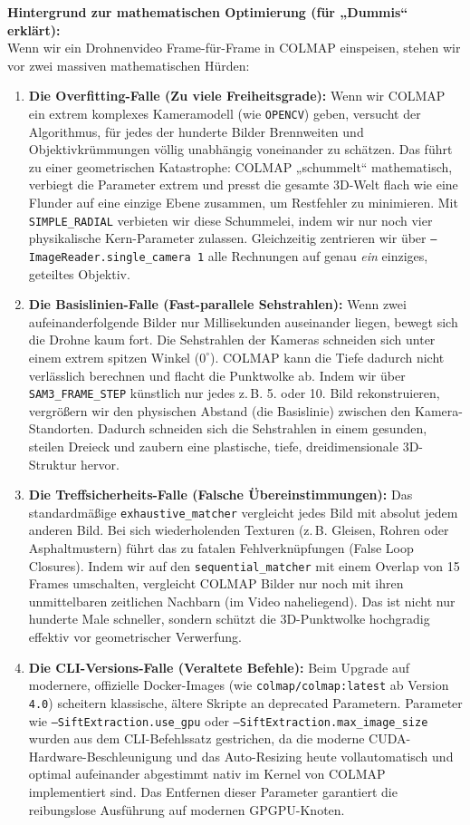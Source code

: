 \documentclass[12pt,a4paper]{article}
\begin{document}
\textbf{Hintergrund zur mathematischen Optimierung (für „Dummis“ erklärt):}\\
Wenn wir ein Drohnenvideo Frame-für-Frame in COLMAP einspeisen, stehen wir vor zwei massiven mathematischen Hürden:
\begin{enumerate}[noitemsep]
    \item \textbf{Die Overfitting-Falle (Zu viele Freiheitsgrade):} Wenn wir COLMAP ein extrem komplexes Kameramodell (wie \texttt{OPENCV}) geben, versucht der Algorithmus, für jedes der hunderte Bilder Brennweiten und Objektivkrümmungen völlig unabhängig voneinander zu schätzen. Das führt zu einer geometrischen Katastrophe: COLMAP „schummelt“ mathematisch, verbiegt die Parameter extrem und presst die gesamte 3D-Welt flach wie eine Flunder auf eine einzige Ebene zusammen, um Restfehler zu minimieren. Mit \texttt{SIMPLE\_RADIAL} verbieten wir diese Schummelei, indem wir nur noch vier physikalische Kern-Parameter zulassen. Gleichzeitig zentrieren wir über \texttt{--ImageReader.single\_camera 1} alle Rechnungen auf genau \textit{ein} einziges, geteiltes Objektiv.
    \item \textbf{Die Basislinien-Falle (Fast-parallele Sehstrahlen):} Wenn zwei aufeinanderfolgende Bilder nur Millisekunden auseinander liegen, bewegt sich die Drohne kaum fort. Die Sehstrahlen der Kameras schneiden sich unter einem extrem spitzen Winkel ($0^\circ$). COLMAP kann die Tiefe dadurch nicht verlässlich berechnen und flacht die Punktwolke ab. Indem wir über \texttt{SAM3\_FRAME\_STEP} künstlich nur jedes z.\,B. 5. oder 10. Bild rekonstruieren, vergrößern wir den physischen Abstand (die Basislinie) zwischen den Kamera-Standorten. Dadurch schneiden sich die Sehstrahlen in einem gesunden, steilen Dreieck und zaubern eine plastische, tiefe, dreidimensionale 3D-Struktur hervor.
    \item \textbf{Die Treffsicherheits-Falle (Falsche Übereinstimmungen):} Das standardmäßige \texttt{exhaustive\_matcher} vergleicht jedes Bild mit absolut jedem anderen Bild. Bei sich wiederholenden Texturen (z.\,B. Gleisen, Rohren oder Asphaltmustern) führt das zu fatalen Fehlverknüpfungen (False Loop Closures). Indem wir auf den \texttt{sequential\_matcher} mit einem Overlap von 15 Frames umschalten, vergleicht COLMAP Bilder nur noch mit ihren unmittelbaren zeitlichen Nachbarn (im Video naheliegend). Das ist nicht nur hunderte Male schneller, sondern schützt die 3D-Punktwolke hochgradig effektiv vor geometrischer Verwerfung.
    \item \textbf{Die CLI-Versions-Falle (Veraltete Befehle):} Beim Upgrade auf modernere, offizielle Docker-Images (wie \texttt{colmap/colmap:latest} ab Version \texttt{4.0}) scheitern klassische, ältere Skripte an deprecated Parametern. Parameter wie \texttt{--SiftExtraction.use\_gpu} oder \texttt{--SiftExtraction.max\_image\_size} wurden aus dem CLI-Befehlssatz gestrichen, da die moderne CUDA-Hardware-Beschleunigung und das Auto-Resizing heute vollautomatisch und optimal aufeinander abgestimmt nativ im Kernel von COLMAP implementiert sind. Das Entfernen dieser Parameter garantiert die reibungslose Ausführung auf modernen GPGPU-Knoten.

\end{enumerate}
\end{document}
